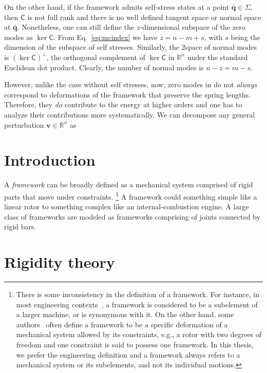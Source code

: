 On the other hand, if the framework admits self-stress states at a point $\bar{\bm{q}} \in \Sigma$, then $\mathsf{C}$ is not full rank and there is no well defined tangent space or normal space at $\bar{\bm{q}}$.
Nonetheless, one can still define the $z$-dimensional subspace of the zero modes as $\ker{\mathsf{C}}$.
From Eq.~\eqref{eq:mcindex} we have $z = n - m + s$, with $s$ being the dimension of the subspace of self stresses.
Similarly, the 2space of normal modes is $(\ker \mathsf{C})^\perp$, the orthogonal complement of $\ker{\mathsf{C}}$ in $\mathbb{R}^n$ under the standard Euclidean dot product.
Clearly, the number of normal modes is $n - z = m - s$.

However, unlike the case without self stresses, now, zero modes in do not \emph{always} correspond to deformations of the framework that preserve the spring lengths.
Therefore, they \emph{do} contribute to the energy at higher orders and one has to analyze their contributions more systematically.
We can decompose any general perturbation $\bm{v} \in \mathbb{R}^n$ as

\section{Introduction}

A \emph{framework} can be broadly defined as a mechanical system comprised of rigid parts that move under constraints.%
\footnote{There is some inconsistency in the definition of a framework.
  For instance, in most engineering contexts~\cite{hartenberg1964,hunt1978,myszka2012}, a framework is considered to be a subelement of a larger machine, or is synonymous with it.
  On the other hand, some authors~\cite{connelly2022} often define a framework to be a specific deformation of a mechanical system allowed by its constraints, e.g., a rotor with two degrees of freedom and one constraint is said to possess one framework.
  In this thesis, we prefer the engineering definition and a framework always refers to a mechanical system or its subelements, and not its individual motions.}
A framework could something simple like a linear rotor to something complex like an internal-combustion engine.
A large class of frameworks are modeled as frameworks comprising of joints connected by rigid bars.

\section{Rigidity theory}

